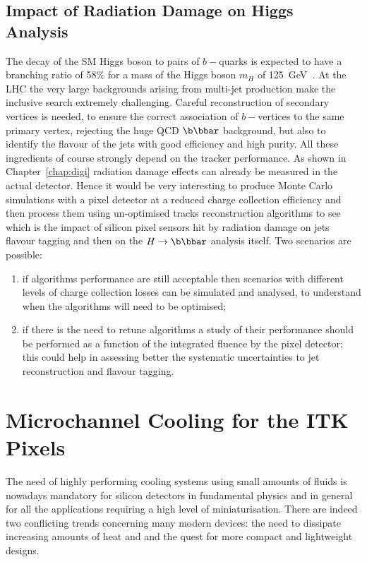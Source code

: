 \subsection{Impact of Radiation Damage on Higgs Analysis}
\label{sec:raddamHiggs}
The decay of the SM Higgs boson to pairs of  $b-$quarks is expected to have a branching ratio of 58\% 
for a mass of the Higgs boson $m_H$ of 125~GeV~\cite{ATLASHbb2017}.
At the LHC the very large backgrounds arising from multi-jet production make the inclusive search
extremely challenging. Careful reconstruction of secondary vertices is needed, to ensure 
the correct association of $b-$vertices to the same primary vertex, rejecting the huge QCD $\b\bbar$ 
background, but also to identify the flavour of the jets with good efficiency and high purity. 
All these ingredients of course strongly depend on the tracker performance. 
As shown in Chapter~\ref{chap:digi} radiation damage effects can already be measured in the actual 
detector. Hence it would be very interesting to produce Monte Carlo simulations with a pixel 
detector at a reduced charge collection efficiency and then process them using un-optimised 
tracks reconstruction algorithms to see which is the impact of silicon pixel sensors hit by radiation 
damage on jets flavour tagging and then on the $H\to\b\bbar$ analysis itself. 
Two scenarios are possible:
\begin{enumerate}
 \item if algorithms performance are still acceptable then scenarios with different levels of charge collection 
 losses can be simulated and analysed, to understand when the  algorithms will need to be optimised;
 \item if there is the need to retune algorithms a study of their performance should be performed
  as a function of the integrated fluence by the pixel detector; this could help in assessing better 
  the systematic uncertainties to jet reconstruction and flavour tagging.
\end{enumerate}



\section{Microchannel Cooling for the ITK Pixels}
\label{sec:microchannels}

The need of highly performing cooling systems using small amounts of fluids is nowadays mandatory for silicon detectors in fundamental physics and in general for all the applications requiring a high level of miniaturisation. There are indeed two conflicting trends concerning many modern devices: the need to dissipate increasing amounts of heat and and the quest for more compact and lightweight designs.

